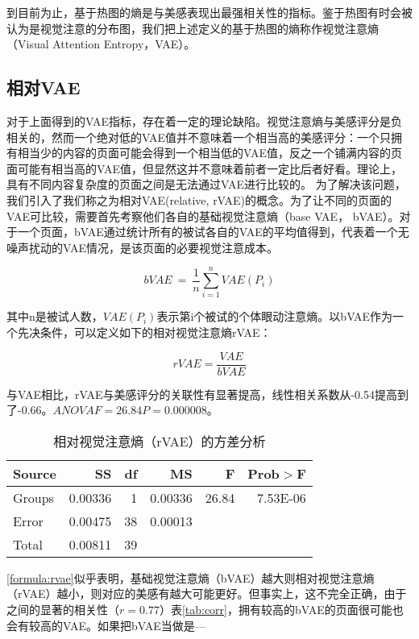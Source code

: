 到目前为止，基于热图的熵是与美感表现出最强相关性的指标。鉴于热图有时会被认为是视觉注意的分布图，我们把上述定义的基于热图的熵称作视觉注意熵（Visual Attention Entropy，VAE）。


\subsection{相对VAE}
对于上面得到的VAE指标，存在着一定的理论缺陷。视觉注意熵与美感评分是负相关的，然而一个绝对低的VAE值并不意味着一个相当高的美感评分：一个只拥有相当少的内容的页面可能会得到一个相当低的VAE值，反之一个铺满内容的页面可能有相当高的VAE值，但显然这并不意味着前者一定比后者好看。理论上，具有不同内容复杂度的页面之间是无法通过VAE进行比较的。
为了解决该问题，我们引入了我们称之为相对VAE(relative, rVAE)的概念。为了让不同的页面的VAE可比较，需要首先考察他们各自的基础视觉注意熵（base VAE， bVAE）。对于一个页面，bVAE通过统计所有的被试各自的VAE的平均值得到，代表着一个无噪声扰动的VAE情况，是该页面的必要视觉注意成本。

$$bVAE~=~\frac{1}{n}\sum_{i=1}^n VAE(P_i)$$

其中n是被试人数，$VAE(P_i)$表示第i个被试的个体眼动注意熵。以bVAE作为一个先决条件，可以定义如下的相对视觉注意熵rVAE：

\begin{equation}
rVAE = \frac{VAE}{bVAE}
\label{formula:rvae}
\end{equation}

与VAE相比，rVAE与美感评分的关联性有显著提高，线性相关系数从-0.54提高到了-0.66。$ANOVA F = 26.84 P = 0.000008$。

\begin{table}[H]
\centering
\begin{tabular}{lrrrrr}
  \hline
  Source&SS&df&MS&F&Prob$>$F\\ \hline
  Groups&0.00336&1&0.00336&26.84&7.53E-06\\
  Error&0.00475&38&0.00013&&\\
  Total&0.00811&39&&&\\
  \hline
\end{tabular}
\caption{相对视觉注意熵（rVAE）的方差分析}
\label{tab:ANOVA-rvae-dw}
\end{table}

\ref{formula:rvae}似乎表明，基础视觉注意熵（bVAE）越大则相对视觉注意熵（rVAE）越小，则对应的美感有越大可能更好。但事实上，这不完全正确，由于之间的显著的相关性（$r = 0.77$）表\ref{tab:corr}，拥有较高的bVAE的页面很可能也会有较高的VAE。如果把bVAE当做是---

